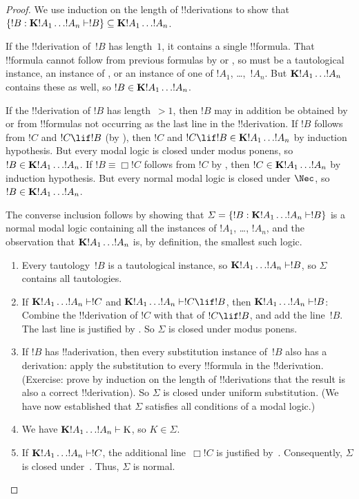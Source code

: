 \documentclass[../../../include/open-logic-section]{subfiles}
\begin{document}
\begin{proof}
  We use induction on the length of !!{derivation}s to show that
  $\Setabs{!B}{\Log{K} !A_1 \dots !A_n \Proves !B} \subseteq
  \Log{K} !A_1 \dots !A_n$.

  If the !!{derivation} of~$!B$ has length~$1$, it contains a single
  !!{formula}. That !!{formula} cannot follow from previous formulas
  by \MP{} or \Nec, so must be a tautological instance, an instance of
  , or an instance
  of one of $!A_1$, \dots,~$!A_n$. But $\Log{K}!A_1\dots!A_n$ contains
  these as well, so $!B \in \Log{K}!A_1 \dots !A_n$.

  If the !!{derivation} of $!B$ has length~$> 1$, then $!B$ may in
  addition be obtained by \MP{} or \Nec{} from !!{formula}s not
  occurring as the last line in the !!{derivation}. If $!B$ follows
  from $!C$ and $!C \lif !B$ (by \MP), then $!C$ and $!C \lif !B \in
  \Log{K}!A_1 \dots !A_n$ by induction hypothesis. But every modal
  logic is closed under modus ponens, so $!B \in \Log{K}!A_1 \dots
  !A_n$. If $!B \equiv \Box !C$ follows from $!C$ by \Nec, then $!C
  \in \Log{K}!A_1 \dots !A_n$ by induction hypothesis. But every
  normal modal logic is closed under $\Nec$, so $!B \in
  \Log{K}!A_1\dots!A_n$.

  The converse inclusion follows by showing that
  $\Sigma = \Setabs{!B}{\Log{K} !A_1 \dots !A_n \Proves !B }$ is a normal
  modal logic containing all the instances of $!A_1$,
  \dots, $!A_n$, and the observation that $\Log{K} !A_1 \dots !A_n$
  is, by definition, the smallest such logic.
  \begin{enumerate}
    \item Every tautology~$!B$ is a tautological instance, so
      $\Log{K}!A_1\dots!A_n \Proves !B$, so $\Sigma$ contains all
      tautologies.
    \item If $\Log{K}!A_1\dots!A_n \Proves !C$ and
      $\Log{K}!A_1\dots!A_n \Proves !C \lif !B$, then
      $\Log{K}!A_1\dots!A_n \Proves !B$: Combine the !!{derivation} of
      $!C$ with that of $!C \lif !B$, and add the line~$!B$. The last
      line is justified by \MP{}. So $\Sigma$ is closed under modus
      ponens.
    \item If $!B$ has !!a{derivation}, then every substitution
      instance of~$!B$ also has a derivation: apply the substitution
      to every !!{formula} in the !!{derivation}. (Exercise: prove by
      induction on the length of !!{derivation}s that the result is
      also a correct !!{derivation}). So $\Sigma$ is closed under
      uniform substitution. (We have now established that $\Sigma$
      satisfies all conditions of a modal logic.)
    \item We have $\Log{K}!A_1\dots!A_n \Proves \Ax{K}$, so $K \in \Sigma$.
    \item If $\Log{K}!A_1\dots!A_n \Proves !C$, the additional
      line~$\Box !C$ is justified by~\Nec. Consequently, $\Sigma$ is
      closed under~\Nec. Thus, $\Sigma$ is normal.
  \end{enumerate}
\end{proof}
\end{document}
